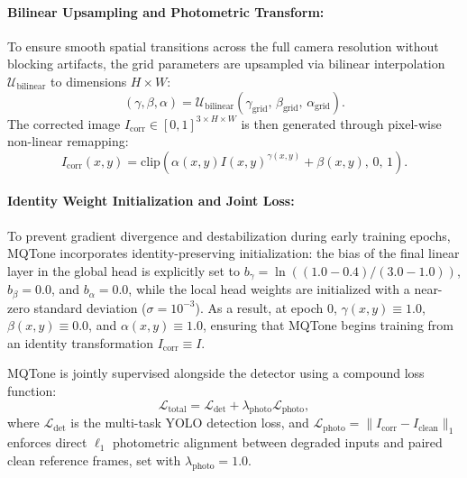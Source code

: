 \documentclass[final,5p,times,twocolumn,authoryear]{elsarticle}
\begin{document}
\paragraph{Bilinear Upsampling and Photometric Transform:}
To ensure smooth spatial transitions across the full camera resolution without blocking artifacts, the grid parameters are upsampled via bilinear interpolation $\mathcal{U}_{\text{bilinear}}$ to dimensions $H \times W$:
\begin{equation}
(\gamma, \beta, \alpha) = \mathcal{U}_{\text{bilinear}}\left( \gamma_{\text{grid}},\, \beta_{\text{grid}},\, \alpha_{\text{grid}} \right).
\end{equation}
The corrected image $I_{\text{corr}} \in [0, 1]^{3 \times H \times W}$ is then generated through pixel-wise non-linear remapping:
\begin{equation}
I_{\text{corr}}(x,y) = \text{clip}\left( \alpha(x,y) I(x,y)^{\gamma(x,y)} + \beta(x,y),\, 0,\, 1 \right).
\label{eq:mqtone_transform}
\end{equation}

\paragraph{Identity Weight Initialization and Joint Loss:}
To prevent gradient divergence and destabilization during early training epochs, MQTone incorporates identity-preserving initialization: the bias of the final linear layer in the global head is explicitly set to $b_{\gamma} = \ln((1.0 - 0.4)/(3.0 - 1.0))$, $b_{\beta} = 0.0$, and $b_{\alpha} = 0.0$, while the local head weights are initialized with a near-zero standard deviation ($\sigma = 10^{-3}$). As a result, at epoch 0, $\gamma(x,y) \equiv 1.0$, $\beta(x,y) \equiv 0.0$, and $\alpha(x,y) \equiv 1.0$, ensuring that MQTone begins training from an identity transformation $I_{\text{corr}} \equiv I$.

MQTone is jointly supervised alongside the detector using a compound loss function:
\begin{equation}
\mathcal{L}_{\text{total}} = \mathcal{L}_{\text{det}} + \lambda_{\text{photo}} \mathcal{L}_{\text{photo}},
\label{eq:total_loss}
\end{equation}
where $\mathcal{L}_{\text{det}}$ is the multi-task YOLO detection loss, and $\mathcal{L}_{\text{photo}} = \| I_{\text{corr}} - I_{\text{clean}} \|_1$ enforces direct $\ell_1$ photometric alignment between degraded inputs and paired clean reference frames, set with $\lambda_{\text{photo}} = 1.0$.
\end{document}
